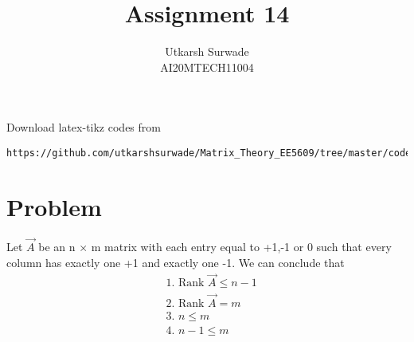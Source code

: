 \documentclass[journal,12pt]{IEEEtran}
\begin{document}
     \def\rightbox#1{\makebox[0in][r]{#1}}
     \def\centbox#1{\makebox[0in]{#1}}
     \def\topbox#1{\raisebox{-\baselineskip}[0in][0in]{#1}}
     \def\midbox#1{\raisebox{-0.5\baselineskip}[0in][0in]{#1}}
\vspace{3cm}
\title{Assignment 14}
\author{Utkarsh Surwade\\AI20MTECH11004}
\maketitle
\bigskip
\renewcommand{\thefigure}{\theenumi}
\renewcommand{\thetable}{\theenumi}
Download latex-tikz codes from 
%
\begin{lstlisting}
https://github.com/utkarshsurwade/Matrix_Theory_EE5609/tree/master/codes
\end{lstlisting}
%
 
\section{\textbf{Problem}}
Let $\vec{A}$ be an n $\times$ m matrix with each entry equal to +1,-1 or 0 such that every column has exactly one +1 and exactly one -1. We can conclude that\\
\begin{align}
    &\mbox{1. Rank } \vec{A}\leq n-1\\
    &\mbox{2. Rank } \vec{A}=m\\    
    &\mbox{3. }n\leq m\\
    &\mbox{4. }n-1\leq m
\end{align}
\end{document}
